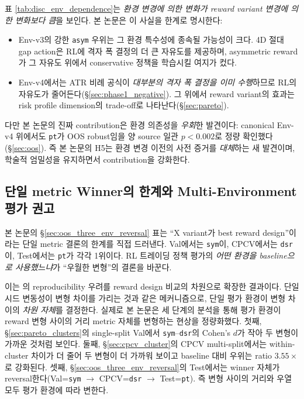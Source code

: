 \documentclass[11pt, a4paper]{article}
\begin{document}
표 \ref{tab:disc_env_dependence}는 \emph{환경 변경에 의한 변화가 reward variant
변경에 의한 변화보다 큼}을 보인다. 본 논문은 이 사실을 한계로 명시한다:
\begin{itemize}[leftmargin=*]
\item Env-v3의 강한 \texttt{asym} 우위는 그 환경 특수성에 종속될 가능성이 크다.
4D 절대 gap action은 RL에 격자 폭 결정의 더 큰 자유도를 제공하며,
asymmetric reward가 그 자유도 위에서 conservative 정책을 학습시킬 여지가 컸다.
\item Env-v4에서는 ATR 비례 공식이 \emph{대부분의 격자 폭 결정을 이미 수행}하므로
RL의 자유도가 줄어든다(\S\ref{sec:phase1_negative}). 그 위에서 reward variant의
효과는 risk profile dimension의 trade-off로 나타난다(\S\ref{sec:pareto}).
\end{itemize}

다만 본 논문의 진짜 contribution은 환경 의존성을 \emph{우회}한 발견이다:
canonical Env-v4 위에서도 \texttt{pt}가 OOS robust임을 양 source 일관 $p<0.002$로
정량 확인했다(\S\ref{sec:oos}). 즉 본 논문의 H5는 환경 변경 이전의 사전 증거를
\emph{대체}하는 새 발견이며, 학술적 엄밀성을 유지하면서 contribution을 강화한다.

\subsection{단일 metric Winner의 한계와 Multi-Environment 평가 권고}
\label{sec:disc_multi_env}

본 논문의 \S\ref{sec:oos_three_env_reversal} 표는 ``X variant가 best reward
design''이라는 단일 metric 결론의 한계를 직접 드러낸다. Val에서는 \texttt{sym}이,
CPCV에서는 \texttt{dsr}이, Test에서는 \texttt{pt}가 각각 1위이다. RL 트레이딩
정책 평가의 \emph{어떤 환경을 baseline으로 사용했느냐}가 ``우월한 변형''의 결론을
바꾼다.

이는 \citet{henderson2018rlreproducibility}의 reproducibility 우려를 reward
design 비교의 차원으로 확장한 결과이다. 단일 시드 변동성이 변형 차이를 가리는
것과 같은 메커니즘으로, 단일 평가 환경이 변형 차이의 \emph{차원 자체}를 결정한다.
실제로 본 논문은 세 단계의 분석을 통해 평가 환경이 reward 변형 사이의 거리
metric 자체를 변형하는 현상을 정량화했다. 첫째, \S\ref{sec:pareto_clusters}의
single-split Val에서 \texttt{sym}--\texttt{dsr}의 Cohen's $d$가 작아 두 변형이
가까운 것처럼 보인다. 둘째, \S\ref{sec:cpcv_cluster}의 CPCV multi-split에서는
within-cluster 차이가 더 줄어 두 변형이 더 가까워 보이고 baseline 대비
우위는 ratio $3.55\times$로 강화된다. 셋째, \S\ref{sec:oos_three_env_reversal}의
Test에서는 winner 자체가 reversal한다(Val=\texttt{sym} $\to$
CPCV=\texttt{dsr} $\to$ Test=\texttt{pt}). 즉 변형 사이의 거리와 우열 모두
평가 환경에 따라 변한다.
\end{document}
